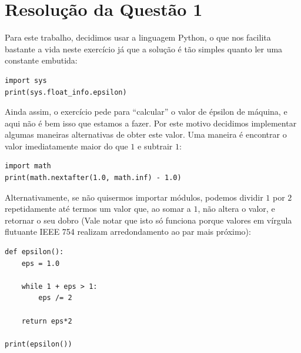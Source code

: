 \documentclass{article}
\begin{document}
\section{Resolução da Questão 1}

Para este trabalho, decidimos usar a linguagem Python, o que nos
facilita bastante a vida neste exercício já que a solução é tão simples
quanto ler uma constante embutida:

\begin{center}
\begin{minipage}{0.8\linewidth}
\begin{lstlisting}[style=pythoncode]
import sys
print(sys.float_info.epsilon)
\end{lstlisting}
\end{minipage}
\end{center}

\noindent
Ainda assim, o exercício pede para ``calcular'' o valor de épsilon de
máquina, e aqui não é bem isso que estamos a fazer. Por este motivo
decidimos implementar algumas maneiras alternativas de obter este valor.
Uma maneira é encontrar o valor imediatamente maior do que $1$ e
subtrair $1$:

\begin{center}
\begin{minipage}{0.8\linewidth}
\begin{lstlisting}[style=pythoncode]
import math
print(math.nextafter(1.0, math.inf) - 1.0)
\end{lstlisting}
\end{minipage}
\end{center}

\noindent
Alternativamente, se não quisermos importar módulos, podemos
dividir $1$ por $2$ repetidamente até termos um valor que, ao
somar a $1$, não altera o valor, e retornar o seu dobro
(Vale notar que isto só funciona porque valores em vírgula
flutuante IEEE 754 realizam arredondamento ao par mais próximo):

\begin{center}
\begin{minipage}{0.8\linewidth}
\begin{lstlisting}[style=pythoncode]
def epsilon():
    eps = 1.0

    while 1 + eps > 1:
        eps /= 2

    return eps*2

print(epsilon())
\end{lstlisting}
\end{minipage}
\end{center}
\end{document}
